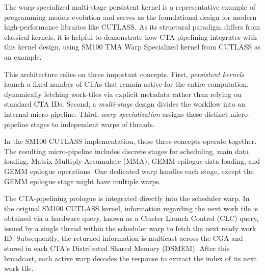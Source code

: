 The warp-specialized multi-stage persistent kernel is a representative example of programming models evolution and serves as the foundational design for modern high-performance libraries like CUTLASS. As its structural paradigm differs from classical kernels, it is helpful to demonstrate how CTA-pipelining integrates with this kernel design, using SM100 TMA Warp Specialized kernel from CUTLASS as an example. 

This architecture relies on three important concepts. First, \textit{persistent kernels} launch a fixed number of CTAs that remain active for the entire computation, dynamically fetching work-tiles via explicit metadata rather than relying on standard CTA IDs. Second, a \textit{multi-stage} design divides the workflow into an internal micro-pipeline. Third, \textit{warp specialization} assigns these distinct micro-pipeline stages to independent warps of threads.



In the SM100 CUTLASS implementation, these three concepts operate together. The resulting micro-pipeline includes discrete stages for scheduling, main data loading, Matrix Multiply-Accumulate (MMA), GEMM epilogue data loading, and GEMM epilogue operations. One dedicated warp handles each stage, except the GEMM epilogue stage might have multiple warps.  

The CTA-pipelining prologue is integrated directly into the scheduler warp. In the original SM100 CUTLASS kernel, information regarding the next work tile is obtained via a hardware query, known as a Cluster Launch Control (CLC) query, issued by a single thread within the scheduler warp to fetch the next ready work ID. Subsequently, the returned information is multicast across the CGA and stored in each CTA's Distributed Shared Memory (DSMEM). After this broadcast, each active warp decodes the response to extract the index of its next work tile.

